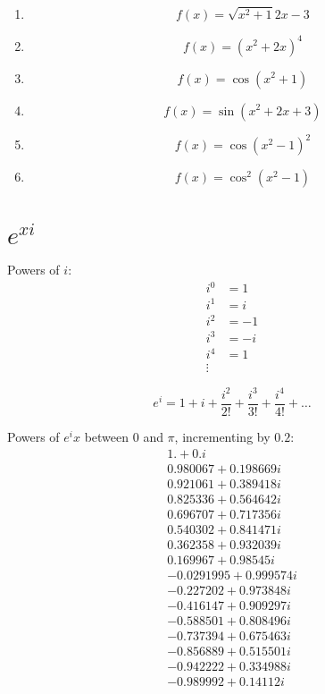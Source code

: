 \documentclass[letterpaper, landscape]{exam}
\begin{document}
  \begin{enumerate}

    \item 
      \[
        f(x) = \sqrt{x^2 + 1}{2x - 3}
      \]

    \item 
      \[
        f(x) = \left( x^2 + 2x \right)^4
      \]

    \item 
      \[
        f(x) = \cos \left( x^2 + 1 \right)
      \]

    \item 
      \[
        f(x) = \sin \left( x^2 + 2x + 3 \right)
      \]

    \item 
      \[
        f(x) = \cos \left( x^2 - 1 \right)^2
      \]

    \item 
      \[
        f(x) = \cos^2 \left( x^2 - 1 \right)
      \]

  \end{enumerate}

  \section{$e^{xi}$} %
  
  Powers of $i$:
  \begin{align*}
    i^0 & = 1 \\
    i^1 & = i \\
    i^2 & = -1 \\
    i^3 & = -i \\
    i^4 & = 1 \\
    \vdots
  \end{align*}

  \[
    e^i = 1 + i + \frac{i^2}{2!} + \frac{i^3}{3!} + \frac{i^4}{4!} + \dots
  \]

  Powers of $e^ix$ between 0 and $\pi$, incrementing by $0.2$:
  \begin{align*}
    1. + 0. i \\
    0.980067 + 0.198669 i \\
    0.921061 + 0.389418 i \\
    0.825336 + 0.564642 i \\
    0.696707 + 0.717356 i \\
    0.540302 + 0.841471 i \\
    0.362358 + 0.932039 i \\
    0.169967 + 0.98545 i \\
    -0.0291995 + 0.999574 i \\
    -0.227202 + 0.973848 i \\
    -0.416147 + 0.909297 i \\
    -0.588501 + 0.808496 i \\
    -0.737394 + 0.675463 i \\
    -0.856889 + 0.515501 i \\
    -0.942222 + 0.334988 i \\
    -0.989992 + 0.14112 i \\
  \end{align*}
\end{document}

